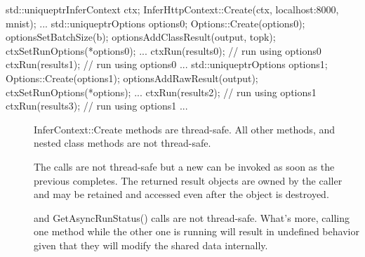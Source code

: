 \documentclass[letterpaper,10pt,english]{sphinxmanual}
\begin{document}
\begin{fulllineitems}
\begin{sphinxVerbatim}[commandchars=\\\{\}]
std::unique\PYGZus{}ptr\PYGZlt{}InferContext\PYGZgt{} ctx;
InferHttpContext::Create(\PYGZam{}ctx, \PYGZdq{}localhost:8000\PYGZdq{}, \PYGZdq{}mnist\PYGZdq{});
...
std::unique\PYGZus{}ptr\PYGZlt{}Options\PYGZgt{} options0;
Options::Create(\PYGZam{}options0);
options\PYGZhy{}\PYGZgt{}SetBatchSize(b);
options\PYGZhy{}\PYGZgt{}AddClassResult(output, topk);
ctx\PYGZhy{}\PYGZgt{}SetRunOptions(*options0);
...
ctx\PYGZhy{}\PYGZgt{}Run(\PYGZam{}results0);  // run using options0
ctx\PYGZhy{}\PYGZgt{}Run(\PYGZam{}results1);  // run using options0
...
std::unique\PYGZus{}ptr\PYGZlt{}Options\PYGZgt{} options1;
Options::Create(\PYGZam{}options1);
options\PYGZhy{}\PYGZgt{}AddRawResult(output);
ctx\PYGZhy{}\PYGZgt{}SetRunOptions(*options);
...
ctx\PYGZhy{}\PYGZgt{}Run(\PYGZam{}results2);  // run using options1
ctx\PYGZhy{}\PYGZgt{}Run(\PYGZam{}results3);  // run using options1
...
\end{sphinxVerbatim}


\begin{description}
\item[{}] \leavevmode
InferContext::Create methods are thread-safe. All other {\hyperref[\detokenize{cpp_api/classnvidia_1_1inferenceserver_1_1client_1_1InferContext:classnvidia_1_1inferenceserver_1_1client_1_1InferContext}]{}} methods, and nested class methods are not thread-safe. 

\item[{\sphinxstylestrong{}}] \leavevmode
The {\hyperref[\detokenize{cpp_api/classnvidia_1_1inferenceserver_1_1client_1_1InferContext:classnvidia_1_1inferenceserver_1_1client_1_1InferContext_1a4cac8002817c9259851305b14c258f36}]{}} calls are not thread-safe but a new {\hyperref[\detokenize{cpp_api/classnvidia_1_1inferenceserver_1_1client_1_1InferContext:classnvidia_1_1inferenceserver_1_1client_1_1InferContext_1a4cac8002817c9259851305b14c258f36}]{}} can be invoked as soon as the previous completes. The returned result objects are owned by the caller and may be retained and accessed even after the {\hyperref[\detokenize{cpp_api/classnvidia_1_1inferenceserver_1_1client_1_1InferContext:classnvidia_1_1inferenceserver_1_1client_1_1InferContext}]{}} object is destroyed. 

\item[{\sphinxstylestrong{}}] \leavevmode
{\hyperref[\detokenize{cpp_api/classnvidia_1_1inferenceserver_1_1client_1_1InferContext:classnvidia_1_1inferenceserver_1_1client_1_1InferContext_1a255a59df29a53d6e45ce86663887615f}]{}} and GetAsyncRunStatus() calls are not thread-safe. What’s more, calling one method while the other one is running will result in undefined behavior given that they will modify the shared data internally. 


\end{description}
\end{fulllineitems}
\end{document}
